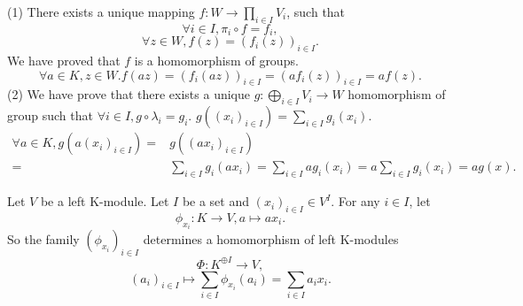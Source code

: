 \documentclass{book}
\numberwithin{equation}{section}
\begin{document}
\begin{proofenv}
    \quad
    \newline
    (1) There exists a unique mapping $f:W\rightarrow \prod_{i\in I}V_i$,  such that 
    $$\forall i\in I, \pi_i\circ f=f_i, $$
    $$\forall z\in W, f(z)=(f_i(z))_{i\in I}.$$
    We have proved that $f$ is a homomorphism of groups.
    $$\forall a\in K, z\in W. f(az)=(f_i(az))_{i\in I}=(af_i(z))_{i\in I}=af(z).$$
    (2) We have prove that there exists a unique $g:\bigoplus_{i\in I}V_i\rightarrow W$ homomorphism of group such that $\forall i\in I,  g\circ \lambda_i=g_i.$ $g\left((x_i)_{i\in I}\right)=\sum_{i\in I}g_i(x_i)$.
    \begin{align*}
        \forall a\in K, g\left(a(x_i)_{i\in I}\right)=&g\left((ax_i)_{i\in I}\right)\\
        =&\sum_{i\in I}g_i(ax_i)=\sum_{i\in I}ag_i(x_i)
        =a\sum_{i\in I}g_i(x_i)=ag(x).
    \end{align*}
\end{proofenv}
\begin{applicationenv}
Let $V$ be a left K-module. Let $I$ be a set and $(x_i)_{i\in I}\in V^{I}$. For any $i\in I$,  let 
$$\phi_{x_i}:K\longrightarrow V, a\mapsto ax_i.$$ 
So the family $(\phi_{x_i})_{i\in I}$ determines a homomorphism of left K-modules 
$$\Phi:K^{\oplus I}\longrightarrow V, $$
$$(a_i)_{i\in I}\longmapsto \sum_{i\in I}\phi_{x_i}(a_i)=\sum_{i\in I}a_ix_i.$$
\end{applicationenv}
\end{document}
